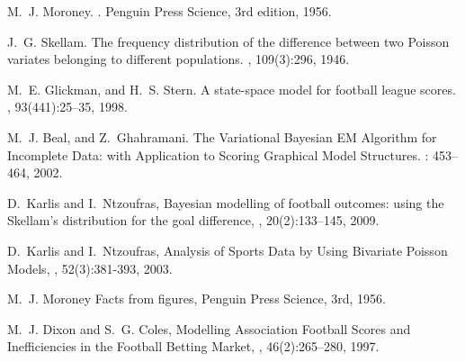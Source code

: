 \begin{thebibliography}{}
M.~J. Moroney.
.
\newblock Penguin Press Science, 3rd edition, 1956.

J.~G. Skellam.
\newblock The frequency distribution of the difference between two
{P}oisson variates belonging to different populations.
, 109(3):296,
  1946.

M.~E. Glickman, and H.~S. Stern.
\newblock A state-space model for football league scores.
, 93(441):25--35,
  1998.

M.~J. Beal, and Z.~Ghahramani.
\newblock The Variational {B}ayesian {EM} Algorithm for Incomplete Data: with
	Application to Scoring Graphical Model Structures.
: 453--464,
2002.

D.~Karlis and I.~Ntzoufras,
\newblock Bayesian modelling of football outcomes: using the {S}kellam's distribution
	for the goal difference,
, 20(2):133--145, 2009.

D.~Karlis and I.~Ntzoufras,
\newblock Analysis of Sports Data by Using Bivariate {P}oisson Models,
, 52(3):381-393, 2003.

M.~J. Moroney
\newblock Facts from figures,
\newblock Penguin Press Science, 3rd, 1956.

M.~J. Dixon and S.~G. Coles,
\newblock Modelling Association Football Scores and Inefficiencies in the Football Betting Market,
, 46(2):265--280, 1997.

\end{thebibliography}